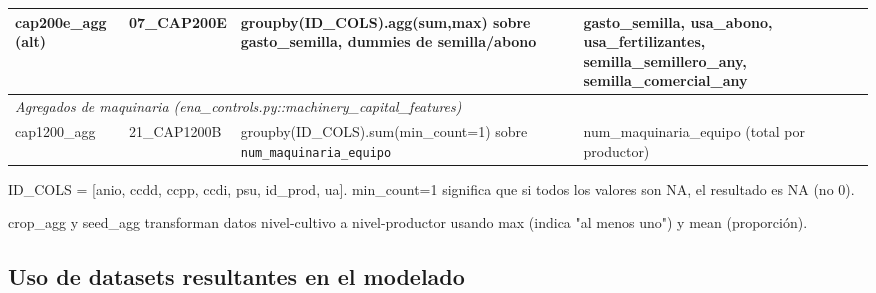 \documentclass[11pt,a4paper]{article}
\begin{document}
\begin{table}[H]
\begin{threeparttable}
\begin{tabular}{p{2.8cm}p{2.5cm}p{4cm}p{4cm}}
cap200e\_agg (alt) & 07\_CAP200E & groupby(ID\_COLS).agg(sum,max) sobre gasto\_semilla, dummies de semilla/abono & gasto\_semilla, usa\_abono, usa\_fertilizantes, semilla\_semillero\_any, semilla\_comercial\_any \\
\midrule
\multicolumn{4}{l}{\textit{Agregados de maquinaria (ena\_controls.py::machinery\_capital\_features)}} \\
cap1200\_agg & 21\_CAP1200B & groupby(ID\_COLS).sum(min\_count=1) sobre \texttt{num\_maquinaria\_equipo} & num\_maquinaria\_equipo (total por productor) \\
\bottomrule
\end{tabular}
\begin{tablenotes}
\footnotesize
\item ID\_COLS = [anio, ccdd, ccpp, ccdi, psu, id\_prod, ua]. min\_count=1 significa que si todos los valores son NA, el resultado es NA (no 0).
\item crop\_agg y seed\_agg transforman datos nivel-cultivo a nivel-productor usando max (indica "al menos uno") y mean (proporción).
\end{tablenotes}
\end{threeparttable}
\end{table}

\subsection{Uso de datasets resultantes en el modelado}
\end{document}
